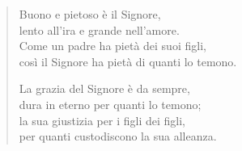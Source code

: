 \documentclass[11pt,a4paper]{book}
\begin{document}
\begin{pages}
\begin{Rightside}
\begin{verse}
            Buono e pietoso è il Signore,\\
            lento all'ira e grande nell'amore.\\
            Come un padre ha pietà dei suoi figli,\\
            così il Signore ha pietà di quanti lo temono.\\
            \rispostasalmoFIN

            La grazia del Signore è da sempre,\\
            dura in eterno per quanti lo temono;\\
            la sua giustizia per i figli dei figli,\\
            per quanti custodiscono la sua alleanza.\\
            \rispostasalmoFIN



\end{verse}
\end{Rightside}
\end{pages}
\end{document}
